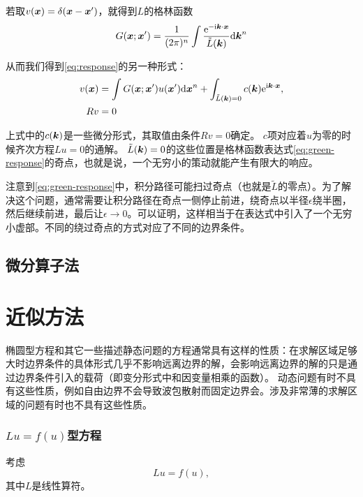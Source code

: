 \documentclass[UTF8, a4paper]{ctexart}
\newcommand*{\ii}{\mathrm{i}}
\newcommand*{\ee}{\mathrm{e}}
\begin{document}
若取$v(\vb*{x})=\delta(\vb*{x} - \vb*{x}')$，就得到$L$的格林函数
\begin{equation}
    G(\vb*{x};\vb*{x}') = \frac{1}{(2\pi)^n} \int \frac{\ee^{ - \ii \vb*{k} \cdot \vb*{x}}}{\tilde{L}(\vb*{k})} \dd \vb*{k}^n
    \label{eq:green-response}
\end{equation}

从而我们得到\eqref{eq:response}的另一种形式：
\begin{equation}
    \begin{aligned}
        v(\vb*{x}) &= \int G(\vb*{x};\vb*{x}') u(\vb*{x}') \dd \vb*{x}^n 
        + \int_{\tilde{L}(\vb*{k})=0} c(\vb*{k}) \ee^{\ii \vb*{k} \cdot \vb*{x}}, \\
        R v &= 0
    \end{aligned}
\end{equation}

上式中的$c(\vb*{k})$是一些微分形式，其取值由条件$Rv=0$确定。
$c$项对应着$u$为零的时候齐次方程$Lu=0$的通解。
$\tilde{L}(\vb*{k})=0$的这些位置是格林函数表达式\eqref{eq:green-response}的奇点，也就是说，一个无穷小的策动就能产生有限大的响应。

注意到\eqref{eq:green-response}中，积分路径可能扫过奇点（也就是$\tilde{L}$的零点）。为了解决这个问题，通常需要让积分路径在奇点一侧停止前进，绕奇点以半径$\epsilon$绕半圈，然后继续前进，最后让$\epsilon \to 0$。可以证明，这样相当于在表达式中引入了一个无穷小虚部。不同的绕过奇点的方式对应了不同的边界条件。

\subsection{微分算子法}

\section{近似方法}

椭圆型方程和其它一些描述静态问题的方程通常具有这样的性质：在求解区域足够大时边界条件的具体形式几乎不影响远离边界的解，会影响远离边界的解的只是通过边界条件引入的载荷（即变分形式中和因变量相乘的函数）。
动态问题有时不具有这些性质，例如自由边界不会导致波包散射而固定边界会。涉及非常薄的求解区域的问题有时也不具有这些性质。

\subsubsection{$Lu=f(u)$型方程}
考虑
\[
    Lu = f(u),
\]
其中$L$是线性算符。
\end{document}

